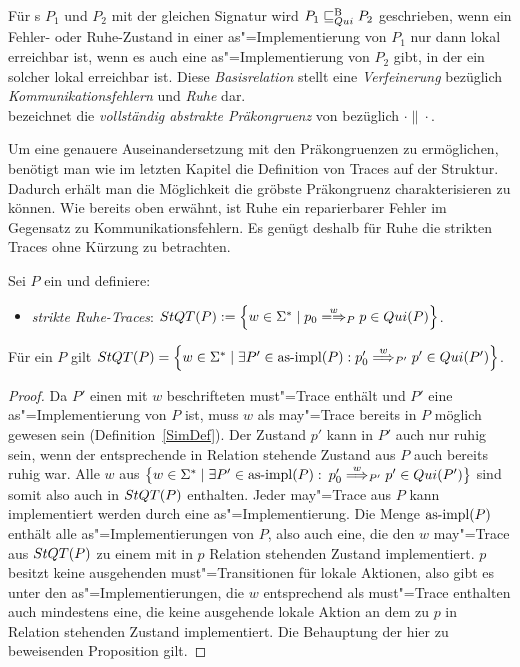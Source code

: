 \begin{Def}
  \label{QBRelDef}
  Für \MEIO{}s $P_1$ und $P_2$ mit der gleichen Signatur wird $P_1 \sqsubseteq  _{Qui}^\mathrm{B} P_2$
  geschrieben, wenn ein Fehler- oder Ruhe-Zustand in einer as"=Implementierung
  von $P_1$ nur dann lokal erreichbar ist, wenn es auch eine
  as"=Implementierung von $P_2$ gibt, in der ein solcher lokal erreichbar ist.
  Diese \emph{Basisrelation} stellt eine \emph{Verfeinerung} bezüglich
  \emph{Kommunikationsfehlern} und \emph{Ruhe} dar.\\
  \QCRel{} bezeichnet die \emph{vollständig abstrakte Präkongruenz} von
  \QBRel{} bezüglich $\cdot\|\cdot$.
\end{Def}

Um eine genauere Auseinandersetzung mit den Präkongruenzen zu ermöglichen,
benötigt man wie im letzten Kapitel die Definition von Traces auf der Struktur.
Dadurch erhält man die Möglichkeit die gröbste Präkongruenz charakterisieren zu
können. Wie bereits oben erwähnt, ist Ruhe ein reparierbarer Fehler im
Gegensatz zu Kommunikationsfehlern. Es genügt deshalb für Ruhe die strikten
Traces ohne Kürzung zu betrachten.

\begin{Def}
  \label{RuheTraceDef}
  Sei $P$ ein \MEIO{} und definiere:
  \begin{itemize}
    \item \emph{strikte Ruhe-Traces}: $\StQT (P) := \left\{w\in\Sigma ^*\mid
      p_0 \weakmay[w]_P p\in Qui(P)\right\}$.
  \end{itemize}
\end{Def}

\begin{Prop}
  \label{QuiTraceProp}
  Für ein \MEIO{} $P$ gilt $\StQT (P) = \left\{w\in\Sigma ^*\mid \exists
  P'\in\asimp (P): p'_0 \weakmust[w]_{P'} p'\in Qui(P')\right\}$.
\end{Prop}
\begin{proof}
  Da $P'$ einen mit $w$ beschrifteten must"=Trace enthält und $P'$ eine
  as"=Implementierung von $P$ ist, muss $w$ als may"=Trace bereits in $P$
  möglich gewesen sein (Definition~\ref{SimDef}). Der Zustand $p'$ kann in $P'$
  auch nur ruhig sein, wenn der entsprechende in Relation stehende Zustand aus
  $P$ auch bereits ruhig war. Alle $w$ aus $\big\{w\in\Sigma ^*\mid \exists
  P'\in\mathrm{as}\text{-}\mathrm{impl} (P):$ $p'_0 \weakmust[w]_{P'} p'\in Qui(P')\big\}$ sind somit also
  auch in $StQT (P)$ enthalten. Jeder may"=Trace aus $P$ kann implementiert
  werden durch eine as"=Implementierung. Die Menge $\mathrm{as}\text{-}\mathrm{impl} (P)$ enthält alle
  as"=Implementierungen von $P$, also auch eine, die den $w$ may"=Trace aus
  $StQT (P)$ zu einem mit in $p$ Relation stehenden Zustand implementiert. $p$
  besitzt keine ausgehenden must"=Transitionen für lokale Aktionen, also gibt es
  unter den as"=Implementierungen, die $w$ entsprechend als must"=Trace
  enthalten auch mindestens eine, die keine ausgehende lokale Aktion an dem zu
  $p$ in Relation stehenden Zustand implementiert. Die Behauptung der hier zu
  beweisenden Proposition gilt.
\end{proof}

